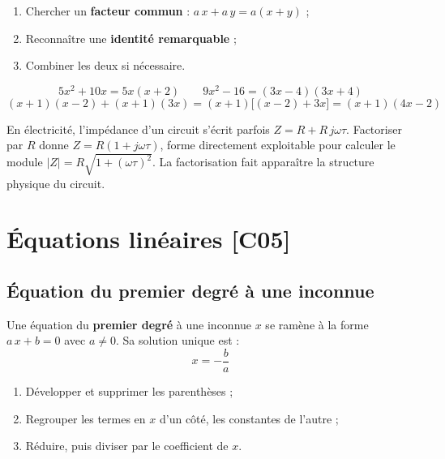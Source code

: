\documentclass[a4paper,11pt]{article}
\begin{document}
\begin{methode}
\begin{enumerate}
  \item Chercher un \textbf{facteur commun} : $a\,x + a\,y = a(x + y)$ ;
  \item Reconnaître une \textbf{identité remarquable} ;
  \item Combiner les deux si nécessaire.
\end{enumerate}
\end{methode}

\begin{exemple}
\[
5x^2 + 10x = 5x(x + 2)
\qquad
9x^2 - 16 = (3x - 4)(3x + 4)
\]
\[
(x+1)(x-2) + (x+1)(3x) = (x+1)\big[(x-2) + 3x\big] = (x+1)(4x - 2)
\]
\end{exemple}

\begin{appliindus}
En électricité, l'impédance d'un circuit s'écrit parfois $Z = R + R\,j\omega\tau$. Factoriser par $R$ donne $Z = R(1 + j\omega\tau)$, forme directement exploitable pour calculer le module $|Z| = R\sqrt{1 + (\omega\tau)^2}$. La factorisation fait apparaître la structure physique du circuit.
\end{appliindus}

\newpage
\section{Équations linéaires \hfill {\normalsize\color{uimmred}[C05]}}

\subsection{Équation du premier degré à une inconnue}

\begin{definition}
Une équation du \textbf{premier degré} à une inconnue $x$ se ramène à la forme $a\,x + b = 0$ avec $a \neq 0$. Sa solution unique est :
\[
\boxed{x = -\frac{b}{a}}
\]
\end{definition}

\begin{methode}[-- Résolution]
\begin{enumerate}
  \item Développer et supprimer les parenthèses ;
  \item Regrouper les termes en $x$ d'un côté, les constantes de l'autre ;
  \item Réduire, puis diviser par le coefficient de $x$.
\end{enumerate}
\end{methode}
\end{document}

